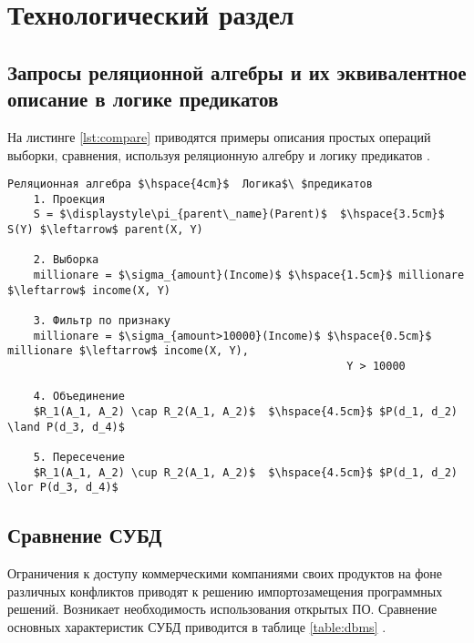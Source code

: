 \chapter{Технологический раздел}

\section{Запросы реляционной алгебры и их эквивалентное описание в логике предикатов}
\vspace{-0.5cm}
На листинге \ref{lst:compare} приводятся примеры описания простых операций выборки, сравнения, используя реляционную алгебру и логику предикатов \cite{rl_similiraty}.

\begin{lstlisting}[label=lst:compare, caption=Сопоставление операций, basicstyle=\small, mathescape, numbers = none]
	Реляционная алгебра $\hspace{4cm}$	Логика$\ $предикатов
	1. Проекция
	S = $\displaystyle\pi_{parent\_name}(Parent)$  $\hspace{3.5cm}$ S(Y) $\leftarrow$ parent(X, Y)
	
	2. Выборка
	millionare = $\sigma_{amount}(Income)$ $\hspace{1.5cm}$ millionare $\leftarrow$ income(X, Y)
	
	3. Фильтр по признаку
	millionare = $\sigma_{amount>10000}(Income)$ $\hspace{0.5cm}$ millionare $\leftarrow$ income(X, Y), 
									   				Y > 10000
									   				
	4. Объединение
	$R_1(A_1, A_2) \cap R_2(A_1, A_2)$	$\hspace{4.5cm}$ $P(d_1, d_2) \land P(d_3, d_4)$
	
	5. Пересечение
	$R_1(A_1, A_2) \cup R_2(A_1, A_2)$	$\hspace{4.5cm}$ $P(d_1, d_2) \lor P(d_3, d_4)$
\end{lstlisting}

\section{Сравнение СУБД}
\vspace{-0.5cm}
Ограничения к доступу коммерческими компаниями своих продуктов на фоне различных конфликтов приводят к решению импортозамещения программных решений. Возникает необходимость использования открытых ПО. Сравнение основных характеристик СУБД приводится в таблице \ref{table:dbms} \cite{comparative_db}.


